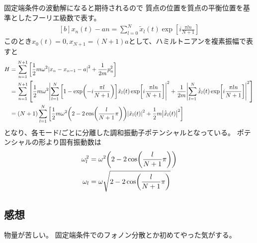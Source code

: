 \documentclass[../../sp_2015.tex]{subfiles}
\begin{document}
\subsection{}
固定端条件の波動解になると期待されるので
質点の位置を質点の平衡位置を基準としたフーリエ級数で表す。
\begin{equation}\begin{aligned}[b]
    x_n(t)-an = \sum_{l=0}^{N} \tilde{x}_l(t)\exp[i\frac{\pi ln}{N+1}]
\end{aligned}\end{equation}
このとき\(x_0(t)=0,x_{N+1}=(N+1)a\)として、ハミルトニアンを複素振幅で表すと
\begin{equation}\begin{aligned}[b]
    H &= \sum_{n=1}^{N+1}\qty[\frac{1}{2}m\omega^2\abs{x_n-x_{n-1}-a}^2+\frac{1}{2m}p_n^2]\\
    &= \sum_{n=1}^{N+1}\qty[\frac{1}{2}m\omega^2\abs{\sum_{l=1}^{N}\qty[1-\exp(-i\frac{\pi l}{N+1})]\tilde{x}_l(t)\exp[i\frac{\pi ln}{N+1}]}^2
    +\frac{1}{2m}\abs{\sum_{l=1}^{N}\dot{\tilde{x}}_l(t)\exp[i\frac{\pi ln}{N+1}]}^2]\\
    &= (N+1)\sum_{l=1}^{N}\qty[\frac{1}{2}m\omega^2\qty(2-2\cos(\frac{l}{N+1}\pi))\abs{\tilde{x}_l(t)}^2+\frac{1}{2}m\abs{\dot{\tilde{x}}_l(t)}^2]
\end{aligned}\end{equation}
となり、各モード\(l\)ごとに分離した調和振動子ポテンシャルとなっている。
ポテンシャルの形より固有振動数は
\begin{equation}\begin{aligned}[b]
    \omega_l^2 &= \omega^2\qty(2-2\cos(\frac{l}{N+1}\pi))\\
    \omega_l &= \omega\sqrt{2-2\cos(\frac{l}{N+1}\pi)}
\end{aligned}\end{equation}



\subsection*{感想}
物量が苦しい。
固定端条件でのフォノン分散とか初めてやった気がする。
\end{document}
